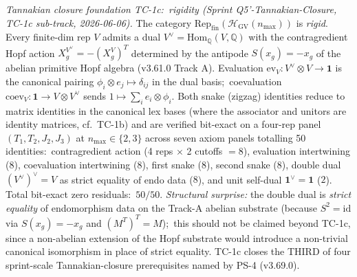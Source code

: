 \documentclass[11pt,a4paper]{article}
\theoremstyle{plain}
\theoremstyle{definition}
\begin{document}
\emph{Tannakian closure foundation TC-1c:\ rigidity (Sprint
Q5'-Tannakian-Closure, TC-1c sub-track, 2026-06-06).}  The category
$\mathrm{Rep}_{\mathrm{fin}}(\mathcal{H}_{\mathrm{GV}}(n_{\max}))$
is \emph{rigid}.  Every finite-dim rep $V$ admits a dual
$V^\vee = \mathrm{Hom}_\mathbb{Q}(V, \mathbb{Q})$ with the
contragredient Hopf action $X_g^{V^\vee} = -(X_g^V)^T$ determined
by the antipode $S(x_g) = -x_g$ of the abelian primitive Hopf
algebra (v3.61.0 Track A).  Evaluation
$\mathrm{ev}_V : V^\vee \otimes V \to \mathbf{1}$ is the canonical
pairing $\phi_i \otimes e_j \mapsto \delta_{ij}$ in the dual basis;\
coevaluation $\mathrm{coev}_V : \mathbf{1} \to V \otimes V^\vee$
sends $1 \mapsto \sum_i e_i \otimes \phi_i$.  Both snake (zigzag)
identities reduce to matrix identities in the canonical lex bases
(where the associator and unitors are identity matrices, cf.\
TC-1b) and are verified bit-exact on a four-rep panel
$(T_1, T_2, J_2, J_3)$ at $n_{\max} \in \{2, 3\}$ across seven
axiom panels totalling 50 identities:\ contragredient action
(4 reps $\times$ 2 cutoffs $= 8$), evaluation intertwining
($8$), coevaluation intertwining ($8$), first snake ($8$), second
snake ($8$), double dual $(V^\vee)^\vee = V$ as strict equality
of endo data ($8$), and unit self-dual
$\mathbf{1}^\vee = \mathbf{1}$ ($2$).  Total bit-exact zero
residuals:\ $50 / 50$.  \emph{Structural surprise:} the double
dual is \emph{strict equality} of endomorphism data on the
Track-A abelian substrate (because $S^2 = \mathrm{id}$ via
$S(x_g) = -x_g$ and $(M^T)^T = M$);\ this should not be claimed
beyond TC-1c, since a non-abelian extension of the Hopf substrate
would introduce a non-trivial canonical isomorphism in place of
strict equality.  TC-1c closes the THIRD of four sprint-scale
Tannakian-closure prerequisites named by PS-4 (v3.69.0).
\end{document}
